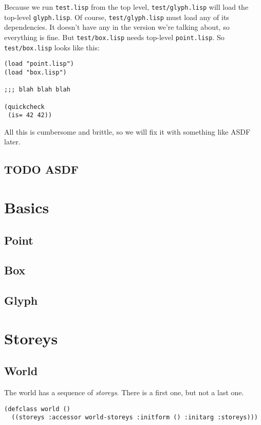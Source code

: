 \documentclass[10pt,oneside,x11names]{article}
\begin{document}
Because we run \texttt{test.lisp} from the top level, \texttt{test/glyph.lisp} will load the
top-level \texttt{glyph.lisp}. Of course, \texttt{test/glyph.lisp} must load any of its
dependencies. It doesn't have any in the version we're talking about, so
everything is fine. But \texttt{test/box.lisp} needs top-level \texttt{point.lisp}. So
\texttt{test/box.lisp} looks like this:

\begin{verbatim}
(load "point.lisp")
(load "box.lisp")

;;; blah blah blah

(quickcheck
 (is= 42 42))
\end{verbatim}

All this is cumbersome and brittle, so we will fix it with something like ASDF
later.

\subsection{{\bfseries\sffamily TODO} ASDF}
\label{sec:orgheadline3}

\section{Basics}
\label{sec:orgheadline8}
\subsection{Point}
\label{sec:orgheadline5}
\subsection{Box}
\label{sec:orgheadline6}
\subsection{Glyph}
\label{sec:orgheadline7}
\section{Storeys}
\label{sec:orgheadline55}

\subsection{World}
\label{sec:orgheadline9}

The world has a sequence of \emph{storeys}. There is a first one, but not a last one.

\begin{verbatim}
(defclass world ()
  ((storeys :accessor world-storeys :initform () :initarg :storeys)))
\end{verbatim}
\end{document}
